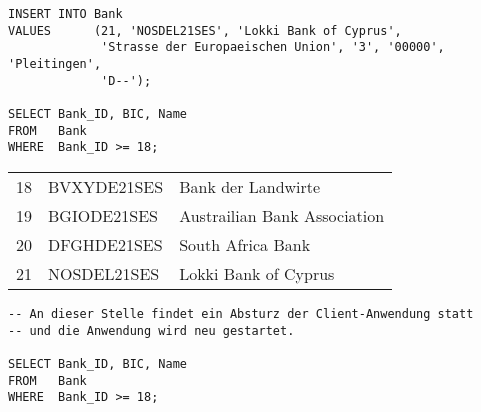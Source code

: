           \begin{lstlisting}[language=oracle_sql,label=sql07_24]
INSERT INTO Bank
VALUES      (21, 'NOSDEL21SES', 'Lokki Bank of Cyprus',
             'Strasse der Europaeischen Union', '3', '00000', 'Pleitingen',
             'D--');

SELECT Bank_ID, BIC, Name
FROM   Bank
WHERE  Bank_ID >= 18;
        \end{lstlisting}
\clearpage
          \begin{center}
            \begin{small}
              \tablehead{}
              \begin{msoraclesql}
                \begin{supertabular}{rll}
                  18 & BVXYDE21SES & Bank der Landwirte \\
                  19 & BGIODE21SES & Austrailian Bank Association \\
                  20 & DFGHDE21SES & South Africa Bank \\
                  21 & NOSDEL21SES & Lokki Bank of Cyprus  \\
                \end{supertabular}
              \end{msoraclesql}
            \end{small}
          \end{center}
          \begin{lstlisting}[language=oracle_sql,label=sql07_25]
-- An dieser Stelle findet ein Absturz der Client-Anwendung statt
-- und die Anwendung wird neu gestartet.

SELECT Bank_ID, BIC, Name
FROM   Bank
WHERE  Bank_ID >= 18;
          \end{lstlisting}
